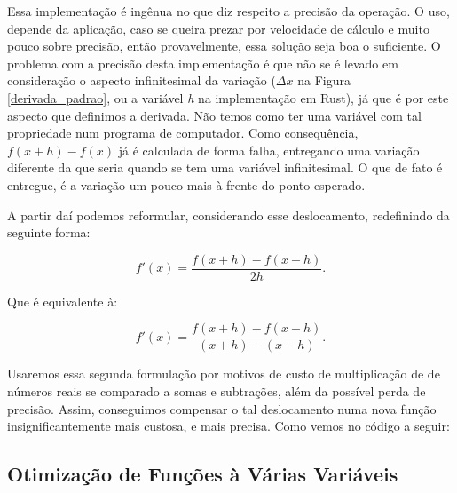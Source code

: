 Essa implementação é ingênua no que diz respeito a precisão da operação. O
uso, depende da aplicação, caso se queira prezar por velocidade de cálculo e
muito pouco sobre precisão, então provavelmente, essa solução seja boa o
suficiente. O problema com a precisão desta implementação é que não se é
levado em consideração o aspecto infinitesimal da variação (\(\Delta x\) na
Figura \ref{derivada_padrao}, ou a variável \textit{h} na implementação
em Rust), já que é por este aspecto que definimos a derivada. Não temos como ter
uma variável com tal propriedade num programa de computador. Como consequência,
\(f(x + h) - f(x)\) já é calculada de forma falha, entregando uma variação
diferente da que seria quando se tem uma variável infinitesimal. O que de fato
é entregue, é a variação um pouco mais à frente do ponto esperado.

A partir daí podemos reformular, considerando esse deslocamento, redefinindo
da seguinte forma:


\begin{equation}
    f'(x) = \frac{f(x + h) - f(x - h)}{2h}.
\end{equation}

Que é equivalente à:

\begin{equation}
    f'(x) = \frac{f(x + h) - f(x - h)}{(x + h) - (x - h)}.
\end{equation}


Usaremos essa segunda formulação por motivos de custo de multiplicação de de
números reais se comparado a somas e subtrações, além da possível perda de
precisão. Assim, conseguimos compensar o tal deslocamento numa nova função
insignificantemente mais custosa, e mais precisa. Como vemos no código a seguir:




\textcolor[rgb]{1,0,0}{\section{{Otimização de Funções à Várias Variáveis}}}

\hspace{0.8cm}





%
